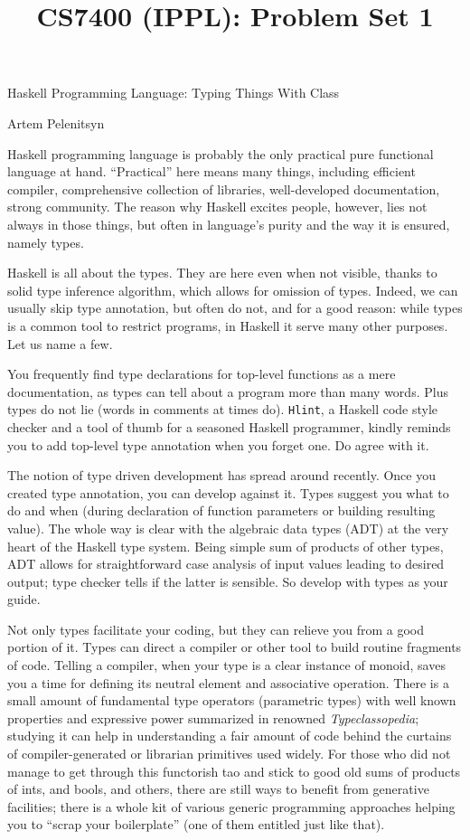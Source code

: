 \documentclass[11pt]{article}
\title{CS7400 (IPPL): Problem Set 1}
\begin{document}
\begin{center}
Haskell Programming Language: Typing Things With Class\\\hspace{0cm}

Artem Pelenitsyn

\vspace{.2cm}
\end{center}

Haskell programming language is probably the only practical pure functional language at hand. ``Practical'' here means many things, including efficient compiler, comprehensive collection of libraries, well-developed documentation, strong community. The reason why Haskell excites people, however, lies not always in those things, but often in language's purity and the way it is ensured, namely types.

Haskell is all about the types. They are here even when not visible, thanks to solid type inference algorithm, which allows for omission of types. Indeed, we can usually skip type annotation, but often do not, and for a good reason: while types is a common tool to restrict programs, in Haskell it serve many other purposes. Let us name a few.

You frequently find type declarations for top-level functions as a mere documentation, as types can tell about a program more than many words. Plus types do not lie (words in comments at times do). \texttt{Hlint}, a Haskell code style checker and a tool of thumb for a seasoned Haskell programmer, kindly reminds you to add top-level type annotation when you forget one. Do agree with it.

The notion of type driven development has spread around recently. Once you created type annotation, you can develop against it. Types suggest you what to do and when (during declaration of function parameters or building resulting value). The whole way is clear with the algebraic data types (ADT) at the very heart of the Haskell type system. Being simple sum of products of other types, ADT allows for straightforward case analysis of input values leading to desired output; type checker tells if the latter is sensible. So develop with types as your guide.

Not only types facilitate your coding, but they can relieve you from a good portion of it. Types can direct a compiler or other tool to build routine fragments of code. Telling a compiler, when your type is a clear instance of monoid, saves you a time for defining its neutral element and associative operation. There is a small amount of fundamental type operators (parametric types) with well known properties and expressive power summarized in renowned \emph{Typeclassopedia}; studying it can help in understanding a fair amount of code behind the curtains of compiler-generated or librarian primitives used widely. For those who did not manage to get through this functorish tao and stick to good old sums of products of ints, and bools, and others, there are still ways to benefit from generative facilities; there is a whole kit of various generic programming approaches helping you to ``scrap your boilerplate'' (one of them entitled just like that).
\end{document}
